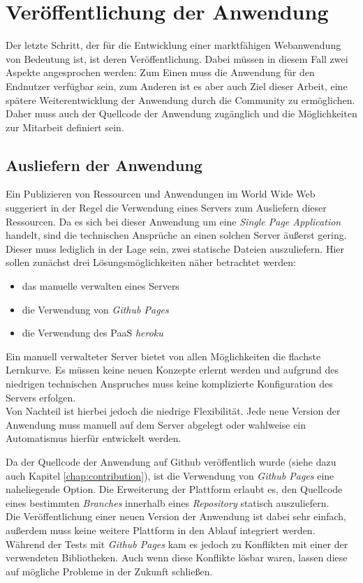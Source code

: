 \chapter{Veröffentlichung der Anwendung}
\thispagestyle{fancy}

Der letzte Schritt, der für die Entwicklung einer marktfähigen Webanwendung von Bedeutung ist, ist deren Veröffentlichung. Dabei müssen in diesem Fall zwei Aspekte angesprochen werden: Zum Einen muss die Anwendung für den Endnutzer verfügbar sein, zum Anderen ist es aber auch Ziel dieser Arbeit, eine spätere Weiterentwicklung der Anwendung durch die Community zu ermöglichen. Daher muss auch der Quellcode der Anwendung zugänglich und die Möglichkeiten zur Mitarbeit definiert sein.

\section{Ausliefern der Anwendung}
\label{chap:hosting}
Ein Publizieren von Ressourcen und Anwendungen im World Wide Web suggeriert in der Regel die Verwendung eines Servers zum Ausliefern dieser Ressourcen. Da es sich bei dieser Anwendung um eine \textit{Single Page Application} handelt, sind die technischen Ansprüche an einen solchen Server äußerst gering. Dieser muss lediglich in der Lage sein, zwei statische Dateien auszuliefern.
Hier sollen zunächst drei Lösungsmöglichkeiten näher betrachtet werden:

\begin{itemize}
  \item das manuelle verwalten eines Servers
  \item die Verwendung von \textit{Github Pages}
  \item die Verwendung des PaaS \textit{heroku}
\end{itemize}

Ein manuell verwalteter Server bietet von allen Möglichkeiten die flachste Lernkurve. Es müssen keine neuen Konzepte erlernt werden und aufgrund des niedrigen technischen Anspruches muss keine komplizierte Konfiguration des Servers erfolgen.\\
Von Nachteil ist hierbei jedoch die niedrige Flexibilität. Jede neue Version der Anwendung muss manuell auf dem Server abgelegt oder wahlweise ein Automatismus hierfür entwickelt werden.

Da der Quellcode der Anwendung auf Github veröffentlich wurde (siehe dazu auch Kapitel \ref{chap:contribution}), ist die Verwendung von \textit{Github Pages} eine naheliegende Option. Die Erweiterung der Plattform erlaubt es, den Quellcode eines bestimmten \textit{Branches} innerhalb eines \textit{Repository} statisch auszuliefern.\\
Die Veröffentlichung einer neuen Version der Anwendung ist dabei sehr einfach, außerdem muss keine weitere Plattform in den Ablauf integriert werden. Während der Tests mit \textit{Github Pages} kam es jedoch zu Konflikten mit einer der verwendeten Bibliotheken. Auch wenn diese Konflikte lösbar waren, lassen diese auf mögliche Probleme in der Zukunft schließen.

